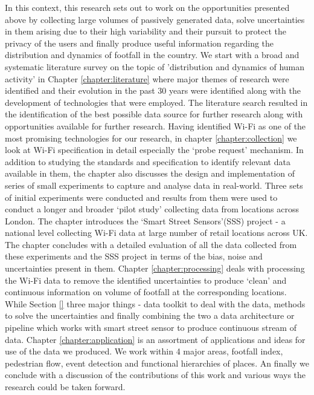 In this context, this research sets out to work on the opportunities presented above by collecting large volumes of passively generated data, solve uncertainties in them arising due to their high variability and their pursuit to protect the privacy of the users and finally produce useful information regarding the distribution and dynamics of footfall in the country.
We start with a broad and systematic literature survey on the topic of 'distribution and dynamics of human activity' in Chapter \ref{chapter:literature} where major themes of research were identified and their evolution in the past 30 years were identified along with the development of technologies that were employed.
The literature search resulted in the identification of the best possible data source for further research along with opportunities available for further research.
Having identified Wi-Fi as one of the most promising technologies for our research, in chapter \ref{chapter:collection} we look at Wi-Fi specification in detail especially the `probe request' mechanism.
In addition to studying the standards and specification to identify relevant data available in them, the chapter also discusses the design and implementation of series of small experiments to capture and analyse data in real-world.
Three sets of initial experiments were conducted and results from them were used to conduct a longer and broader `pilot study' collecting data from locations across London.
The chapter introduces the `Smart Street Sensors'(SSS) project - a national level collecting Wi-Fi data at large number of retail locations across UK.
The chapter concludes with a detailed evaluation of all the data collected from these experiments and the SSS project in terms of the bias, noise and uncertainties present in them.
Chapter \ref{chapter:processing} deals with processing the Wi-Fi data to remove the identified uncertainties to produce `clean' and continuous information on volume of footfall at the corresponding locations.
While Section \ref{} 
three major things - data toolkit to deal with the data, methods to solve the uncertainties and finally combining the two a data architecture or pipeline which works with smart street sensor to produce continuous stream of data.
Chapter \ref{chapter:application} is an assortment of applications and ideas for use of the data we produced. We work within 4 major areas, footfall index, pedestrian flow, event detection and functional hierarchies of places. An finally we conclude with a discussion of the contributions of this work and various ways the research could be taken forward.

